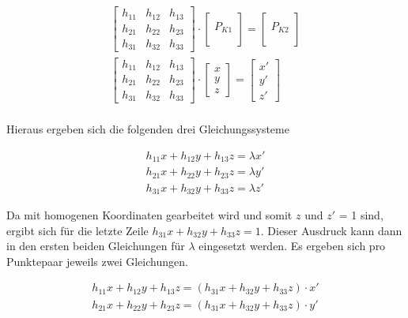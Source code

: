 \begin{gather}
\begin{bmatrix}
h_{11}&h_{12}&h_{13}\\
h_{21}&h_{22}&h_{23}\\
h_{31}&h_{32}&h_{33}
\end{bmatrix}
\cdot
\begin{bmatrix}
\\P_{K1}\\\\
\end{bmatrix}
=
\begin{bmatrix}
\\P_{K2}\\\\
\end{bmatrix}\\
\begin{bmatrix}
h_{11}&h_{12}&h_{13}\\
h_{21}&h_{22}&h_{23}\\
h_{31}&h_{32}&h_{33}
\end{bmatrix}
\cdot
\begin{bmatrix}
x\\y\\z
\end{bmatrix}
=
\begin{bmatrix}
x'\\y'\\z'
\end{bmatrix}\\
\end{gather}

Hieraus ergeben sich die folgenden drei Gleichungssysteme

\begin{gather}
h_{11}x+h_{12}y+h_{13}z= \lambda x'\\
h_{21}x+h_{22}y+h_{23}z= \lambda y'\\
h_{31}x+h_{32}y+h_{33}z= \lambda z'
\end{gather}

Da mit homogenen Koordinaten gearbeitet wird und somit $z$ und $z'$ = 1 sind, ergibt sich für die letzte Zeile $h_{31}x+h_{32}y+h_{33}z= 1$. Dieser Ausdruck kann dann in den ersten beiden Gleichungen für $\lambda$ eingesetzt werden. Es ergeben sich pro Punktepaar jeweils zwei Gleichungen. 

\begin{gather}
	h_{11}x+h_{12}y+h_{13}z= (h_{31}x+h_{32}y+h_{33}z) \cdot x'\\
		h_{21}x+h_{22}y+h_{23}z= (h_{31}x+h_{32}y+h_{33}z) \cdot y'
\end{gather}

